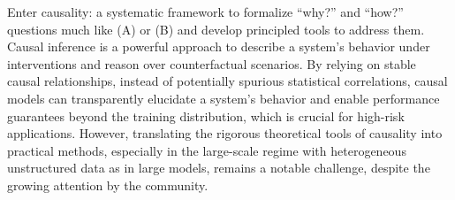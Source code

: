 \documentclass{article}
\newcommand{\todo}[1]{\textcolor{red}{~TODO: #1}}
\begin{document}
Enter causality: a systematic framework to formalize ``why?'' and ``how?'' questions much like (A) or (B) and develop principled tools to address them.
Causal inference is a powerful approach to describe a system's behavior under interventions and reason over counterfactual scenarios. 
By %
relying on stable causal relationships, 
instead of potentially spurious statistical correlations,
causal models can transparently elucidate a system's behavior and enable performance guarantees beyond the training distribution, which is crucial for high-risk applications.
However, translating the rigorous theoretical tools of causality into practical methods, especially in the large-scale regime with heterogeneous unstructured data as in large models, remains a notable challenge, despite the growing attention by the community.


\end{document}

